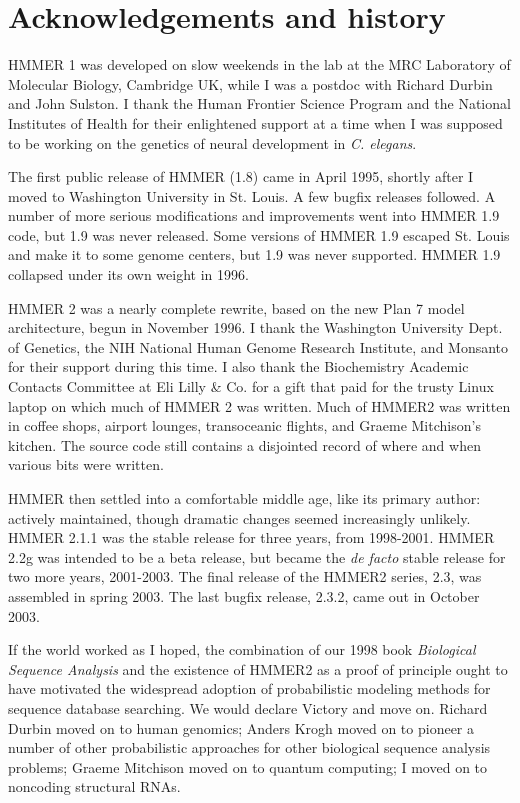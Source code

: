 \section{Acknowledgements and history}

HMMER 1 was developed on slow weekends in the lab at the MRC
Laboratory of Molecular Biology, Cambridge UK, while I was a postdoc
with Richard Durbin and John Sulston. I thank the Human Frontier
Science Program and the National Institutes of Health for their
enlightened support at a time when I was supposed to be working on the
genetics of neural development in \emph{C. elegans}.

The first public release of HMMER (1.8) came in April 1995, shortly
after I moved to Washington University in St. Louis. A few bugfix
releases followed. A number of more serious modifications and
improvements went into HMMER 1.9 code, but 1.9 was never
released. Some versions of HMMER 1.9 escaped St. Louis and make it to
some genome centers, but 1.9 was never supported. HMMER 1.9 collapsed
under its own weight in 1996.

HMMER 2 was a nearly complete rewrite, based on the new Plan 7 model
architecture, begun in November 1996. I thank the Washington
University Dept. of Genetics, the NIH National Human Genome Research
Institute, and Monsanto for their support during this time.  I also
thank the Biochemistry Academic Contacts Committee at Eli Lilly \&
Co. for a gift that paid for the trusty Linux laptop on which much of
HMMER 2 was written. Much of HMMER2 was written in coffee shops,
airport lounges, transoceanic flights, and Graeme Mitchison's
kitchen. The source code still contains a disjointed record of where
and when various bits were written.

HMMER then settled into a comfortable middle age, like its primary
author: actively maintained, though dramatic changes seemed
increasingly unlikely. HMMER 2.1.1 was the stable release for three
years, from 1998-2001.  HMMER 2.2g was intended to be a beta release,
but became the \emph{de facto} stable release for two more years,
2001-2003. The final release of the HMMER2 series, 2.3, was assembled
in spring 2003.  The last bugfix release, 2.3.2, came out in October
2003.

If the world worked as I hoped, the combination of our 1998 book
\emph{Biological Sequence Analysis} and the existence of HMMER2 as a
proof of principle ought to have motivated the widespread adoption of
probabilistic modeling methods for sequence database searching. We
would declare Victory and move on. Richard Durbin moved on to human
genomics; Anders Krogh moved on to pioneer a number of other
probabilistic approaches for other biological sequence analysis
problems; Graeme Mitchison moved on to quantum computing; I moved on
to noncoding structural RNAs.

